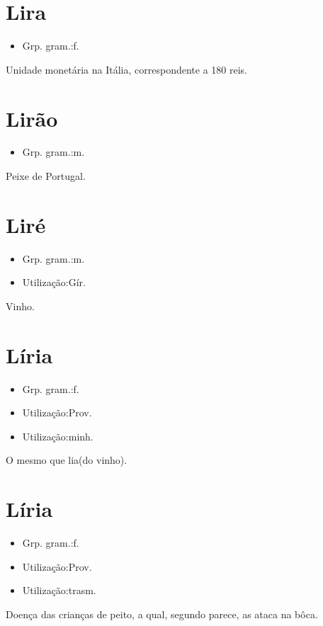 \section{Lira}
\begin{itemize}
\item {Grp. gram.:f.}
\end{itemize}
Unidade monetária na Itália, correspondente a 180 reis.
\section{Lirão}
\begin{itemize}
\item {Grp. gram.:m.}
\end{itemize}
Peixe de Portugal.
\section{Liré}
\begin{itemize}
\item {Grp. gram.:m.}
\end{itemize}
\begin{itemize}
\item {Utilização:Gír.}
\end{itemize}
Vinho.
\section{Líria}
\begin{itemize}
\item {Grp. gram.:f.}
\end{itemize}
\begin{itemize}
\item {Utilização:Prov.}
\end{itemize}
\begin{itemize}
\item {Utilização:minh.}
\end{itemize}
O mesmo que \textunderscore lia\textunderscore  (do vinho).
\section{Líria}
\begin{itemize}
\item {Grp. gram.:f.}
\end{itemize}
\begin{itemize}
\item {Utilização:Prov.}
\end{itemize}
\begin{itemize}
\item {Utilização:trasm.}
\end{itemize}
Doença das crianças de peito, a qual, segundo parece, as ataca na bôca.
